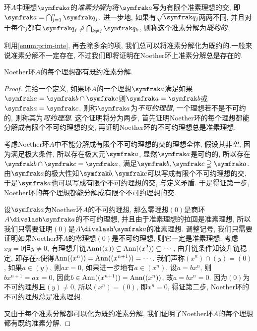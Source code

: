 
\begin{definition}
  环$A$中理想$\ideal{a}$的\emph{准素分解}为将$\ideal{a}$写为有限个准素理想的交, 即$\ideal{a}=\bigcap_{j=1}^n\ideal{q}_j$. 进一步地, 如果有$\sqrt{\ideal{q}_j}$两两不同, 并且对于每个$j$都有$\ideal{q}_j\nsupseteq\bigcap_{k\neq j}\ideal{q}_k$, 则称这个准素分解为\emph{既约的}.
\end{definition}

利用\ref{enum:prim-inte}, 再去除多余的项, 我们总可以将准素分解化为既约的.一般来说准素分解不一定存在, 不过我们即将证明在Noether环上准素分解总是存在的.

\begin{theorem}\label{thm:laskernoether}
  Noether环$A$的每个理想都有既约准素分解.
\end{theorem}

\begin{proof}
  先给一个定义, 如果环$A$的一个理想$\ideal{a}$满足如果$\ideal{a}=\ideal{b}\cap\ideal{c}$则$\ideal{a}=\ideal{b}$或$\ideal{a}=\ideal{c}$, 则称$\ideal{a}$为\emph{不可约理想}, 一个理想若不是不可约的, 则称其为\emph{可约理想}. 这个证明将分为两步, 首先证明Noether环的每个理想都能分解成有限个不可约理想的交, 再证明Noether环的不可约理想总是准素理想.

  考虑Noether环$A$中不能分解成有限个不可约理想的交的理想全体, 假设其非空, 因为满足极大条件, 所以存在极大元$\ideal{a}$, 显然$\ideal{a}$是可约的, 所以存在$\ideal{b}\cap\ideal{c}=\ideal{a}$, 满足$\ideal{b}, \ideal{c}\supsetneqq\ideal{a}$. 由$\ideal{a}$的极大性知$\ideal{b}, \ideal{c}$可以写成有限个不可约理想的交, 于是$\ideal{a}$也可以写成有限个不可约理想的交, 与定义矛盾. 于是得证第一步, Noether环的每个理想都能分解成有限个不可约理想的交.

  设$\ideal{a}$为Noether环$A$的不可约理想, 那么零理想$(0)$是商环$A{\divslash}\ideal{a}$的不可约理想, 并且由于准素理想的拉回是准素理想, 所以我们只需要证明$(0)$是$A{\divslash}\ideal{a}$的准素理想. 调整记号, 我们只需要证明如果Noether环$A$的零理想$(0)$是不可约理想, 则它一定是准素理想. 考虑$xy=0$但$y\neq 0$, 有理想升链$\operatorname{Ann}((x))\subseteq\operatorname{Ann}((x^2))\subseteq\dotsb$, 由升链条件知该升链稳定, 即存在$n$使得$\operatorname{Ann}((x^n))=\operatorname{Ann}((x^{n+1}))=\dotsb$. 我们声称$(x^n)\cap (y)=(0)$, 如果$a\in (y)$, 则$ax=0$, 如果进一步地有$a\in (x^n)$, 设$a=bx^n$, 则$bx^{n+1}=ax=0$, 因此$b\in\operatorname{Ann}((x^{n+1}))=\operatorname{Ann}((x^n))$, 故$a=bx^n=0$. 因为$(0)$为不可约理想且$(y)\neq 0$, 所以$(x^n)=(0)$, 即$x^n=0$, 得证第二步, Noether环的不可约理想总是准素理想.

  又由于每个准素分解都可以化为既约准素分解, 我们证明了Noether环$A$的每个理想都有既约准素分解.
\end{proof}

